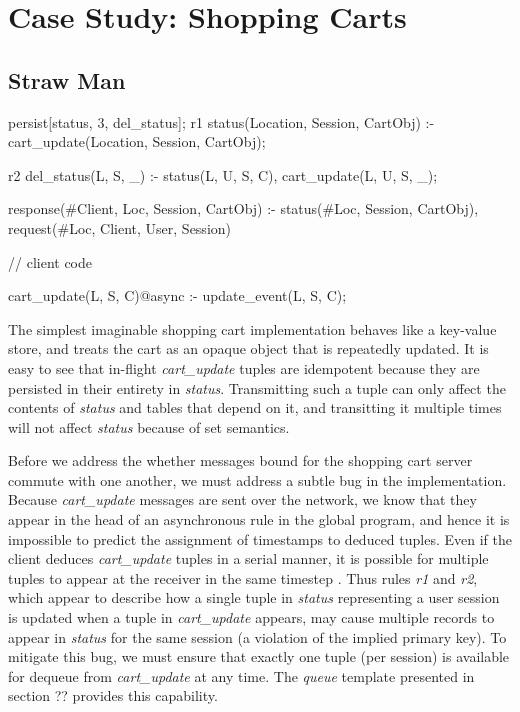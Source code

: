 \section{Case Study: Shopping Carts}


\subsection{Straw Man}

\begin{Dedalus}
persist[status, 3, del_status];
r1
status(Location, Session, CartObj) :-
    cart_update(Location,  Session, CartObj);
    
r2
del_status(L, S, _) :-
    status(L, U, S, C),
    cart_update(L, U, S, _);

response(#Client, Loc, Session, CartObj) :-
    status(#Loc, Session, CartObj),
    request(#Loc, Client, User, Session)

// client code

cart_update(L, S, C)@async :- 
    update_event(L, S, C);

\end{Dedalus}

The simplest imaginable shopping cart implementation behaves like a key-value store,
and treats the cart as an opaque object that is repeatedly updated.  It is easy to see that
in-flight {\em cart\_update} tuples are idempotent 
because they are persisted in their entirety
in {\em status}.  Transmitting such a tuple can only affect the contents of {\em status} and tables that depend on it, and transitting it multiple times will not affect {\em status} because of set
semantics.

Before we address the whether messages bound for the shopping cart server commute 
with one another, we must address a subtle bug in the implementation.  Because {\em cart\_update}
messages are sent over the network, we know that they appear in the head of an asynchronous 
rule in the global program, and hence it is impossible to predict the assignment of timestamps
to deduced tuples.  Even if the client deduces {\em cart\_update} tuples in a serial manner, it
is possible for multiple tuples to appear at the receiver in the same timestep .  Thus rules {\em r1} 
and {\em r2}, which appear to describe how a single tuple in {\em status} representing a user
session is updated when a tuple in {\em cart\_update} appears, may cause multiple records
to appear in {\em status} for the same session (a violation of the implied primary key).
To mitigate this bug, we must ensure that exactly one tuple (per session) is available for dequeue
from {\em cart\_update} at any time.  The \emph{queue} template presented in section ?? 
provides this capability.

